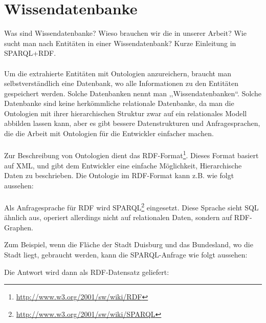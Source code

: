 \section{Wissendatenbanke}
Was sind Wissendatenbanke? Wieso brauchen wir die in unserer Arbeit? Wie sucht man nach Entitäten in einer Wissendatenbank? Kurze Einleitung in SPARQL+RDF.
\paragraph{}
Um die extrahierte Entitäten mit Ontologien anzureichern, braucht man selbstverständlich eine Datenbank, wo alle Informationen zu den Entitäten gespeichert werden. Solche Datenbanken nennt man ,,Wissendatenbanken``. Solche Datenbanke sind keine herkömmliche relationale Datenbanke, da man die Ontologien mit ihrer hierarchischen Struktur zwar auf ein relationales Modell abbilden lassen kann, aber es gibt bessere Datenstrukturen und Anfragesprachen, die die Arbeit mit Ontologien für die Entwickler einfacher machen.

\paragraph{}
Zur Beschreibung von Ontologien dient das RDF-Format\footnote{\url{http://www.w3.org/2001/sw/wiki/RDF}}. Dieses Format basiert auf XML, und gibt dem Entwickler eine einfache Möglichkeit, Hierarchische Daten zu beschrieben. Die Ontologie im RDF-Format kann z.B. wie folgt aussehen:
\lstset{language=XML}


\paragraph{}
Als Anfragesprache für RDF wird SPARQL\footnote{\url{http://www.w3.org/2001/sw/wiki/SPARQL}} eingesetzt. Diese Sprache sieht SQL ähnlich aus, operiert allerdings nicht auf relationalen Daten, sondern auf RDF-Graphen. 

Zum Beispiel, wenn die Fläche der Stadt Duisburg und das Bundesland, wo die Stadt liegt, gebraucht werden, kann die SPARQL-Anfrage wie folgt aussehen:
\lstset{language=SPARQL}


Die Antwort wird dann als RDF-Datensatz geliefert:
\lstset{language=XML}
